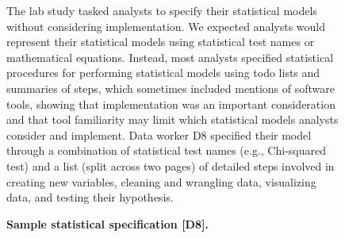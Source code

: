{\begin{figure}
\begin{minipage}{0.45\textwidth}
        \end{minipage}
        \caption{\textbf{Sample statistical specification [D8].}\label{figure:labStudyStatSpec}}
            \begin{small}
            \begin{minipage}{\linewidth}
            The lab study tasked analysts
            to specify their statistical models without
            considering implementation. 
            We expected analysts would represent
            their statistical models using statistical test names or mathematical equations. 
            Instead, most analysts specified statistical procedures for performing statistical models 
            using todo lists and summaries of steps,
            which sometimes included mentions of software tools, showing that
            implementation was an important consideration and
            that tool familiarity may limit which statistical models
            analysts consider and implement.
            Data worker D8 specified their model through a combination of statistical test names (e.g., Chi-squared test) and a list (split across two pages) of detailed steps
            involved in creating new variables, cleaning and wrangling data,
            visualizing data, and testing their hypothesis. 
            \end{minipage}
            \end{small}
    \end{figure}
}

